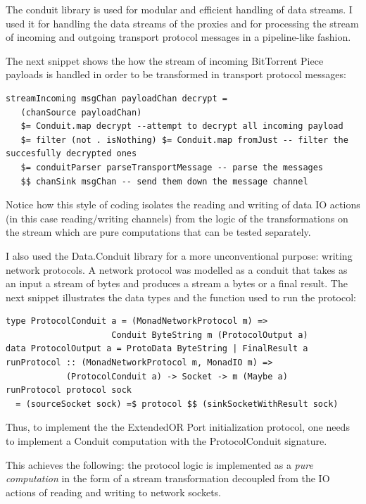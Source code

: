 \documentclass[11pt]{book} %
\begin{document}

The conduit library is used for modular and efficient handling of data streams. I used it for handling the data streams of the proxies and for processing the stream of incoming and outgoing transport protocol messages  in a pipeline-like fashion.

The next snippet shows the how the stream of incoming BitTorrent Piece payloads is handled in order to be transformed in transport protocol messages:

\begin{lstlisting}
streamIncoming msgChan payloadChan decrypt =
   (chanSource payloadChan)
   $= Conduit.map decrypt --attempt to decrypt all incoming payload
   $= filter (not . isNothing) $= Conduit.map fromJust -- filter the succesfully decrypted ones
   $= conduitParser parseTransportMessage -- parse the messages
   $$ chanSink msgChan -- send them down the message channel
\end{lstlisting}

Notice how this style of coding isolates the reading and writing of data IO actions (in this case reading/writing channels) from the logic of the transformations on the stream which are pure computations that can be tested separately.

I also used the Data.Conduit library for a more unconventional purpose: writing network protocols. A network protocol was modelled as a conduit that takes as an input a stream of bytes and produces a stream a bytes or a final result. The next snippet illustrates the data types and the function used to run the protocol:

\begin{lstlisting}
type ProtocolConduit a = (MonadNetworkProtocol m) =>
					 Conduit ByteString m (ProtocolOutput a)
data ProtocolOutput a = ProtoData ByteString | FinalResult a
runProtocol :: (MonadNetworkProtocol m, MonadIO m) =>
			(ProtocolConduit a) -> Socket -> m (Maybe a)
runProtocol protocol sock
  = (sourceSocket sock) =$ protocol $$ (sinkSocketWithResult sock)
\end{lstlisting}

Thus, to implement the the ExtendedOR Port initialization protocol, one needs to implement a Conduit computation with the ProtocolConduit signature.

This achieves the following: the protocol logic is implemented as a \textit{pure computation}  in the form of a stream transformation decoupled from the IO actions of reading and writing to network sockets.
\end{document}
